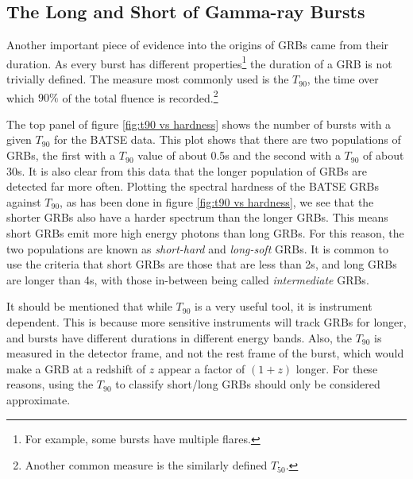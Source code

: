 \documentclass[11pt]{cuthesis}
\begin{document}
\subsection{The Long and Short of Gamma-ray Bursts}
Another important piece of evidence into the origins of GRBs came from their duration. As every burst has different properties\footnote{For example, some bursts have multiple flares.} the duration of a GRB is not trivially defined. The measure most commonly used is the $T_{90}$, the time over which $90\%$ of the total fluence is recorded.\footnote{Another common measure is the similarly defined $T_{50}$.} 

The top panel of figure \ref{fig:t90 vs hardness} shows the number of bursts with a given $T_{90}$ for the BATSE data. This plot shows that there are two populations of GRBs, the first with a $T_{90}$ value of about 0.5s and the second with a $T_{90}$ of about 30s. It is also clear from this data that the longer population of GRBs are detected far more often. Plotting the spectral hardness of the BATSE GRBs against $T_{90}$, as has been done in figure \ref{fig:t90 vs hardness}, we see that the shorter GRBs also have a harder spectrum than the longer GRBs. This means short GRBs emit more high energy photons than long GRBs. For this reason, the two populations are known as \textit{short-hard} and \textit{long-soft} GRBs. It is common to use the criteria that short GRBs are those that are less than 2s, and long GRBs are longer than 4s, with those in-between being called \textit{intermediate} GRBs.


It should be mentioned that while $T_{90}$ is a very useful tool, it is instrument dependent. This is because more sensitive instruments will track GRBs for longer, and bursts have different durations in different energy bands. Also, the $T_{90}$ is measured in the detector frame, and not the rest frame of the burst, which would make a GRB at a redshift of $z$ appear a factor of $(1+z)$ longer. For these reasons, using the $T_{90}$ to classify short/long GRBs should only be considered approximate.  
\end{document}
